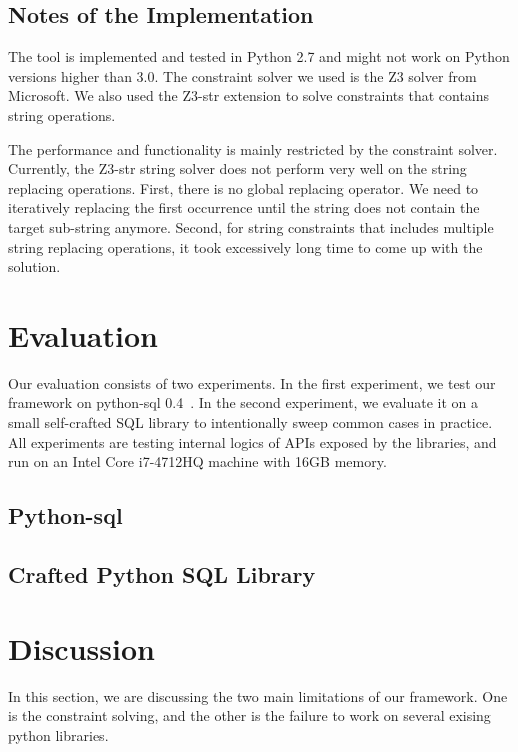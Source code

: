 \documentclass[conference]{IEEEtran}
\begin{document}
\subsection{Notes of the Implementation}

The tool is implemented and tested in Python 2.7 and might not work on Python versions higher than 3.0.
The constraint solver we used is the Z3 solver from Microsoft. We also used the Z3-str extension to solve constraints that contains string operations.

The performance and functionality is mainly restricted by the constraint solver. Currently, the Z3-str string solver does not perform very well on the string replacing operations. First, there is no global replacing operator. We need to iteratively replacing the first occurrence until the string does not contain the target sub-string anymore. Second, for string constraints that includes multiple string replacing operations, it took excessively long time to come up with the solution.


\section{Evaluation}
\label{evaluation}
Our evaluation consists of two experiments. In the first experiment, we test our framework on python-sql 0.4~\cite{python-sql}. In the second experiment, we evaluate it on a small self-crafted SQL library to intentionally sweep common cases in practice. All experiments are testing internal logics of APIs exposed by the libraries, and run on an Intel Core i7-4712HQ machine with 16GB memory.

\subsection{Python-sql}
\label{python-sql}

\subsection{Crafted Python SQL Library}
\label{crafted-sql}

\section{Discussion}
\label{discussion}
In this section, we are discussing the two main limitations of our framework. One is the constraint solving, and the other is the failure to work on several exising python libraries.
\end{document}
